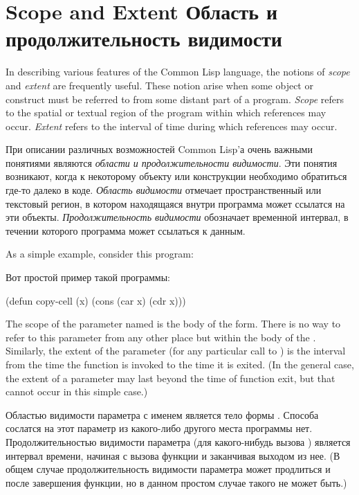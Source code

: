 
\clearpage\def\pagestatus{FINAL PROOF}

\chapter{Scope and Extent Область и продолжительность видимости}
\label{SCOPE}

In describing various features of the Common Lisp language, the notions of
{\it scope} and {\it extent} are frequently useful.  These notion arise when
some object or construct must be referred to from some distant part of a
program.  {\it Scope} refers to the spatial or textual region of the
program within which references may occur.  {\it Extent} refers to the
interval of time during which references may occur.

При описании различных возможностей Common Lisp'а очень важными понятиями
являются {\it области и продолжительности видимости}. Эти понятия возникают,
когда к некоторому объекту или конструкции необходимо обратиться где-то далеко в
коде. {\it Область видимости} отмечает пространственный или текстовый регион, в
котором находящаяся внутри программа может ссылатся на эти 
объекты. {\it Продолжительность видимости} обозначает временной интервал, в течении
которого программа может ссылаться к данным.

As a simple example, consider this program:

Вот простой пример такой программы:
\begin{lisp}
(defun copy-cell (x) (cons (car x) (cdr x)))
\end{lisp}
The scope of the parameter named  is the body of the  form.
There is no way to refer to this parameter from any other place but within
the body of the .  Similarly, the extent of the parameter 
(for any particular call to ) is the interval from the time
the function is invoked to the time it is exited.  (In the general case,
the extent of a parameter may last beyond the time of function exit,
but that cannot occur in this simple case.)

Областью видимости параметра с именем  является тело формы .
Способа сослатся на этот параметр из какого-либо другого места программы
нет. Продолжительностью видимости параметра  (для какого-нибудь вызова
) является интервал времени, начиная с вызова функции и заканчивая
выходом из нее. (В общем случае продолжительность видимости параметра может
продлиться и после завершения функции, но в данном простом случае такого не
может быть.) 

